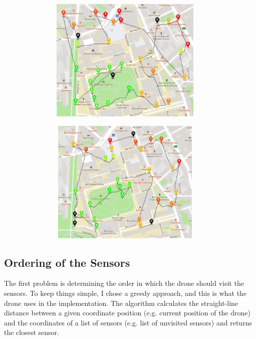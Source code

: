 \documentclass[11pt]{article}
\begin{document}
\begin{figure}[h]
    \centering
    \begin{minipage}{0.5\textwidth}
        \centering
        \includegraphics[width=0.95\textwidth, height=16em]{25-10-2021}
        \label{fig:example1}
    \end{minipage}%
    \begin{minipage}{0.5\textwidth}
        \centering
        \includegraphics[width=0.95\textwidth, height=16em]{26-12-2021}
        \label{fig:example2}
    \end{minipage}
\end{figure}

\subsection{Ordering of the Sensors}
The first problem is determining the order in which the drone should visit the sensors. To keep things simple, I chose a greedy approach, and this is what the drone uses in the implementation. The algorithm calculates the straight-line distance between a given coordinate position (e.g. current position of the drone) and the coordinates of a list of sensors (e.g. list of unvisited sensors) and returns the closest sensor.
\end{document}
